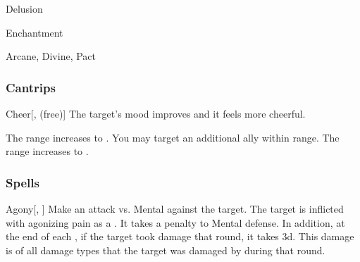 \newpage
\begin{spellsection}{Delusion}

\begin{spellheader}
\end{spellheader}


 Enchantment

 Arcane, Divine, Pact

\subsubsection{Cantrips}


\begin{freeability}{Cheer}[,  (free)]
The target's mood improves and it feels more cheerful.

\rankline
{} The range increases to \rngmed.
 You may target an additional ally within range.
 The range increases to \rnglong.
\end{freeability}

\end{spellsection}


\subsubsection{Spells}


\lowercase{\hypertarget{spell:Agony}{}}\label{spell:Agony}
\begin{freeability}[Rank 1]{\hypertarget{spell:Agony}{Agony}}[, ]
Make an attack vs. Mental against the target.
\hit The target is inflicted with agonizing pain as a .
It takes a  penalty to Mental defense.
In addition, at the end of each , if the target took damage that round, it takes  \minus3d.
This damage is of all damage types that the target was damaged by during that round.
\end{freeability}
\vspace{0.25em}



